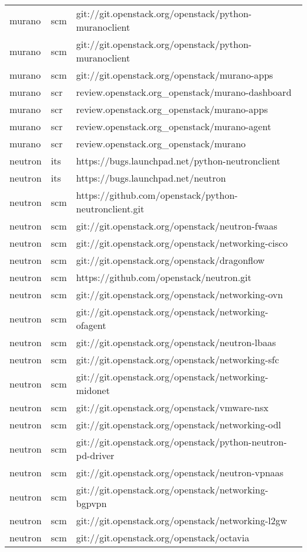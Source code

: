 \begin{center}
\begin{longtable}{|p{4cm}|p{1cm}|p{10cm}|}
murano&scm&git://git.openstack.org/openstack/python-muranoclient\\ 
murano&scm&git://git.openstack.org/openstack/python-muranoclient\\ 
murano&scm&git://git.openstack.org/openstack/murano-apps\\ 
murano&scr&review.openstack.org\_openstack/murano-dashboard\\ 
murano&scr&review.openstack.org\_openstack/murano-apps\\ 
murano&scr&review.openstack.org\_openstack/murano-agent\\ 
murano&scr&review.openstack.org\_openstack/murano\\ 
neutron&its&https://bugs.launchpad.net/python-neutronclient\\ 
neutron&its&https://bugs.launchpad.net/neutron\\ 
neutron&scm&https://github.com/openstack/python-neutronclient.git\\ 
neutron&scm&git://git.openstack.org/openstack/neutron-fwaas\\ 
neutron&scm&git://git.openstack.org/openstack/networking-cisco\\ 
neutron&scm&git://git.openstack.org/openstack/dragonflow\\ 
neutron&scm&https://github.com/openstack/neutron.git\\ 
neutron&scm&git://git.openstack.org/openstack/networking-ovn\\ 
neutron&scm&git://git.openstack.org/openstack/networking-ofagent\\ 
neutron&scm&git://git.openstack.org/openstack/neutron-lbaas\\ 
neutron&scm&git://git.openstack.org/openstack/networking-sfc\\ 
neutron&scm&git://git.openstack.org/openstack/networking-midonet\\ 
neutron&scm&git://git.openstack.org/openstack/vmware-nsx\\ 
neutron&scm&git://git.openstack.org/openstack/networking-odl\\ 
neutron&scm&git://git.openstack.org/openstack/python-neutron-pd-driver\\ 
neutron&scm&git://git.openstack.org/openstack/neutron-vpnaas\\ 
neutron&scm&git://git.openstack.org/openstack/networking-bgpvpn\\ 
neutron&scm&git://git.openstack.org/openstack/networking-l2gw\\ 
neutron&scm&git://git.openstack.org/openstack/octavia\\ 

\end{longtable}
\end{center}

